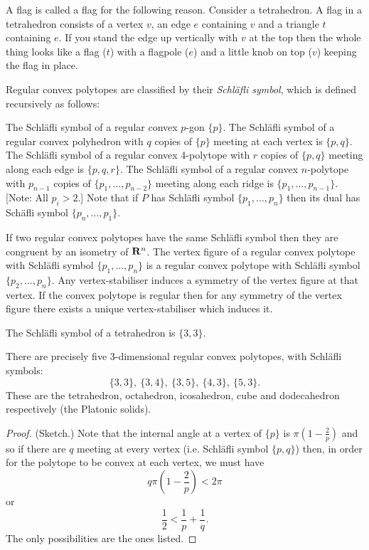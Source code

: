 \documentclass[12pt]{article}
\begin{document}
A flag is called a flag for the following reason. Consider a tetrahedron. A flag in a tetrahedron consists of a vertex $v$, an edge $e$ containing $v$ and a triangle $t$ containing $e$. If you stand the edge up vertically with $v$ at the top then the whole thing looks like a flag ($t$) with a flagpole ($e$) and a little knob on top ($v$) keeping the flag in place.

Regular convex polytopes are classified by their {\em Schl\"afli symbol}, which is defined recursively as follows:

\begin{dfn}
The Schl\"afli symbol of a regular convex $p$-gon $\{p\}$. The Schl\"afli symbol of a regular convex polyhedron with $q$ copies of $\{p\}$ meeting at each vertex is $\{p,q\}$. The Schl\"afli symbol of a regular convex 4-polytope with $r$ copies of $\{p,q\}$ meeting along each edge is $\{p,q,r\}$. The Schl\"afli symbol of a regular convex $n$-polytope with $p_{n-1}$ copies of $\{p_1,\ldots,p_{n-2}\}$ meeting along each ridge is $\{p_1,\ldots,p_{n-1}\}$. [Note: All $p_i>2$.] Note that if $P$ has Schl\"afli symbol $\{p_1,\ldots,p_n\}$ then its dual has Sch\"afli symbol $\{p_n,\ldots,p_1\}$.
\end{dfn}

\begin{thm}
  If two regular convex polytopes have the same Schl\"afli symbol then they are congruent by an isometry of $\mathbf{R}^n$. The vertex figure of a regular convex polytope with Schl\"afli symbol $\{p_1,\ldots,p_n\}$ is a regular convex polytope with Schl\"afli symbol $\{p_2,\ldots,p_n\}$. Any vertex-stabiliser induces a symmetry of the vertex figure at that vertex. If the convex polytope is regular then for any symmetry of the vertex figure there exists a unique vertex-stabiliser which induces it.
\end{thm}

\begin{exm}
  The Schl\"afli symbol of a tetrahedron is $\{3,3\}$.
\end{exm}

\begin{thm}
  There are precisely five 3-dimensional regular convex polytopes, with Schl\"afli symbols:
  \[\{3,3\},\ \{3,4\},\ \{3,5\},\ \{4,3\},\ \{5,3\}.\]
  These are the tetrahedron, octahedron, icosahedron, cube and dodecahedron respectively (the Platonic solids).
\end{thm}
\begin{proof}
  (Sketch.) Note that the internal angle at a vertex of $\{p\}$ is $\pi\left(1-\frac{2}{p}\right)$ and so if there are $q$ meeting at every vertex (i.e. Schl\"afli symbol $\{p,q\}$) then, in order for the polytope to be convex at each vertex, we must have
  \[q\pi\left(1-\frac{2}{p}\right)<2\pi\]
  or
  \[\frac{1}{2}<\frac{1}{p}+\frac{1}{q}.\]
  The only possibilities are the ones listed.
\end{proof}
\end{document}
